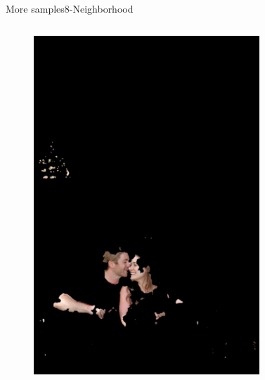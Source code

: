 \documentclass{beamer}
\begin{document}
\begin{frame}{More samples}{8-Neighborhood}
\begin{columns}
\begin{column}{3cm}
\begin{figure}
		\includegraphics[width=0.9\textwidth]{label2000} 
		\end{figure}
\end{column}
\begin{column}{3cm}
	\begin{figure}

\end{figure}
\end{column}
\end{columns}
\end{frame}
\end{document}
